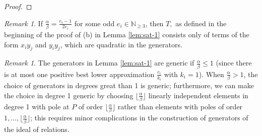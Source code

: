 \documentclass{amsart}
\theoremstyle{plain}
\theoremstyle{definition}
\theoremstyle{remark}
\newtheorem{rem}[thm]{Remark}
\numberwithin{equation}{section}
\newcommand\BN{{\mathbb N}}
\begin{document}
\begin{proof}



\end{proof}

\begin{rem}\label{rem:quad-gen}
If $\frac{\alpha}{\beta}=\frac{e_i-1}{2 e_i}$ for some odd $e_i \in \BN_{\geq 3}$, then $T,$ as defined in the beginning of the proof of (b) in Lemma \ref{lem:sat-1} consists only of terms of the form $x_i y_j$ and $y_i y_j$, which are quadratic in the generators.
\end{rem}


\begin{rem}\label{rem:sat-1-gen-lem-generic}
The generators in Lemma \ref{lem:sat-1} are generic if $\frac{\alpha}{\beta}\le 1$ (since there is at most one positive best lower approximation $\frac{c_i}{k_i}$ with $k_i=1$).  When $\frac{\alpha}{\beta}>1$, the choice of generators in degrees great than 1 is generic; furthermore, we can make the choice in degree 1 generic by choosing $\lfloor \frac{\alpha}{\beta}\rfloor$ linearly independent elements in degree 1 with pole at $P$ of order $\lfloor \frac{\alpha}{\beta}\rfloor$ rather than elements with poles of order $1, \ldots, \lfloor \frac{\alpha}{\beta}\rfloor$; this requires minor complications in the construction of generators of the ideal of relations.
\end{rem}
\end{document}
